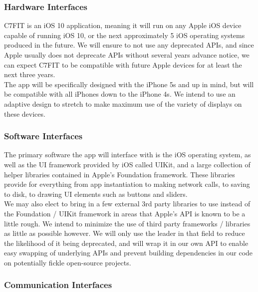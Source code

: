 \documentclass[letterpaper,10pt,titlepage]{article}
\begin{document}
\subsubsection{Hardware Interfaces}

C7FIT is an iOS 10 application, meaning it will run on any Apple iOS device capable of running iOS 10, or the next approximately 5 iOS operating systems produced in the future. We will ensure to not use any deprecated APIs, and since Apple usually does not deprecate APIs without several years advance notice, we can expect C7FIT to be compatible with future Apple devices for at least the next three years.\\

The app will be specifically designed with the iPhone 5s and up in mind, but will be compatible with all iPhones down to the iPhone 4s. We intend to use an adaptive design to stretch to make maximum use of the variety of displays on these devices.\\

\subsubsection{Software Interfaces}

The primary software the app will interface with is the iOS operating system, as well as the UI framework provided by iOS called UIKit, and a large collection of helper libraries contained in Apple’s Foundation framework. These libraries provide for everything from app instantiation to making network calls, to saving to disk, to drawing UI elements such as buttons and sliders.\\

We may also elect to bring in a few external 3rd party libraries to use instead of the Foundation / UIKit framework in areas that Apple’s API is known to be a little rough. We intend to minimize the use of third party frameworks / libraries as little as possible however. We will only use the leader in that field to reduce the likelihood of it being deprecated, and will wrap it in our own API to enable easy swapping of underlying APIs and prevent building dependencies in our code on potentially fickle open-source projects.\\

\subsubsection{Communication Interfaces}
\end{document}
